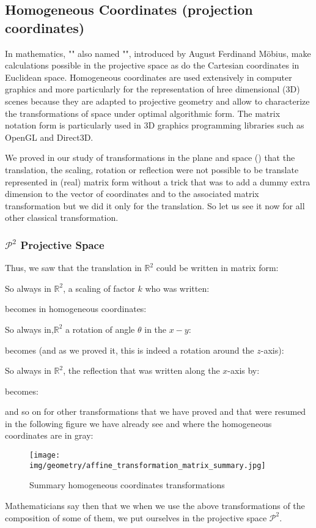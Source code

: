 	\subsection{Homogeneous Coordinates (projection coordinates)}
	In mathematics, "" also named "", introduced by August Ferdinand Möbius, make calculations possible in the projective space as do the Cartesian coordinates in Euclidean space. Homogeneous coordinates are used extensively in computer graphics and more particularly for the representation of hree dimensional (3D) scenes  because they are adapted to projective geometry and allow to characterize the transformations of space under optimal algorithmic form. The matrix notation form is particularly used in 3D graphics programming  libraries such as OpenGL and Direct3D.

	We proved in our study of transformations in the plane and space () that the translation, the scaling, rotation or reflection were not possible to be translate represented in (real) matrix form without a trick that was to add a dummy extra dimension to the vector of coordinates and to the associated matrix transformation but we did it only for the translation. So let us see it now for all other classical transformation.
	
	\subsubsection{$\mathcal{P}^2$ Projective Space}
	Thus, we saw that the translation in $\mathbb{R}^2$ could be written in matrix form:
	
	So always in $\mathbb{R}^2$, a scaling of factor $k$ who was written:
	
	becomes in homogeneous coordinates:
	
	So always in,$\mathbb{R}^2$ a rotation of angle $\theta$ in the $x-y$:
	
	becomes (and as we proved it, this is indeed a rotation around the $z$-axis):
	
	So always in $\mathbb{R}^2$, the reflection that was written along the $x$-axis by:
	
	becomes:
	
	and so on for other transformations that we have proved and that were resumed in the following figure we have already see and where the homogeneous coordinates are in gray:
	\begin{figure}[H]
		\centering
		\texttt{[image: img/geometry/affine\_transformation\_matrix\_summary.jpg]}
		\caption{Summary homogeneous coordinates transformations}
	\end{figure}
	Mathematicians say then that we when we use the above transformations of the composition of some of them, we put ourselves in the projective space $\mathcal{P}^2$.
	
